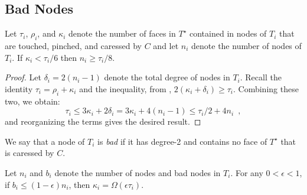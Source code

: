 \documentclass{patmorin}
\newcommand{\dual}[1]{{#1}^\star}
\newcommand{\note}[2]{{\color{red}#1:~#2}}
\begin{document}
\subsection{Bad Nodes}


\begin{lem}
  Let $\tau_i$, $\rho_i$, and $\kappa_i$ denote the number of faces
  in $\dual{T}$ contained in nodes of $T_i$ that are touched, pinched,
  and caressed by $C$ and let $n_i$ denote the number of nodes of $T_i$.
  If $\kappa_i < \tau_i/6$ then $n_i\ge \tau_i/8$.
\end{lem}

\begin{proof}
  Let $\delta_i=2(n_i-1)$ denote the total degree of nodes in $T_i$.
  Recall the identity $\tau_i = \rho_i+\kappa_i$ and the inequality,
  from , $2(\kappa_i+\delta_i)
  \ge \tau_i$. Combining these two, we obtain:
  \[
  \tau_i 
     \le 3\kappa_i + 2\delta_i 
     = 3\kappa_i + 4(n_i-1) 
     \le \tau_i/2 + 4n_i \enspace ,
  \]
  and reorganizing the terms gives the desired result.
\end{proof}

We say that a node of $T_i$ is \emph{bad} if it has degree-2 and contains
no face of $\dual{T}$ that is caressed by $C$.

\begin{lem}
   Let $n_i$ and $b_i$ denote the number of nodes and bad nodes in
   $T_i$. For any $0<\epsilon < 1$, if $b_i \le (1-\epsilon)n_i$, then
   $\kappa_i = \Omega(\epsilon\tau_i)$.
\end{lem}
\end{document}
